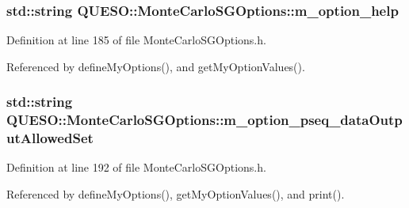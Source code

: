 \hypertarget{class_q_u_e_s_o_1_1_monte_carlo_s_g_options_a604e9d58aa974b08eb38d70199c5d654}{
\subsubsection[{m\-\_\-option\-\_\-help}]{\setlength{\rightskip}{0pt plus 5cm}std\-::string Q\-U\-E\-S\-O\-::\-Monte\-Carlo\-S\-G\-Options\-::m\-\_\-option\-\_\-help\hspace{0.3cm}{\ttfamily [private]}}}\label{class_q_u_e_s_o_1_1_monte_carlo_s_g_options_a604e9d58aa974b08eb38d70199c5d654}


Definition at line 185 of file Monte\-Carlo\-S\-G\-Options.\-h.



Referenced by define\-My\-Options(), and get\-My\-Option\-Values().

\hypertarget{class_q_u_e_s_o_1_1_monte_carlo_s_g_options_a496b1325324965abbeffd3ef8b919975}{
\subsubsection[{m\-\_\-option\-\_\-pseq\-\_\-data\-Output\-Allowed\-Set}]{\setlength{\rightskip}{0pt plus 5cm}std\-::string Q\-U\-E\-S\-O\-::\-Monte\-Carlo\-S\-G\-Options\-::m\-\_\-option\-\_\-pseq\-\_\-data\-Output\-Allowed\-Set\hspace{0.3cm}{\ttfamily [private]}}}\label{class_q_u_e_s_o_1_1_monte_carlo_s_g_options_a496b1325324965abbeffd3ef8b919975}


Definition at line 192 of file Monte\-Carlo\-S\-G\-Options.\-h.



Referenced by define\-My\-Options(), get\-My\-Option\-Values(), and print().

